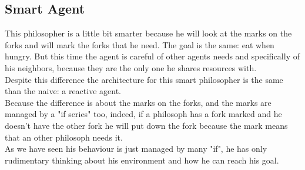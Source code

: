 \subsection{Smart Agent}
This philosopher is a little bit smarter because he will look at the marks on the forks and will mark the forks that he need. The goal is the same: eat when hungry. But this time the agent is careful of other agents needs and specifically of his neighbors, because they are the only one he shares resources with.\\
Despite this difference the architecture for this smart philosopher is the same than the naive: a reactive agent.\\
Because the difference is about the marks on the forks, and the marks are managed by a "if series" too, indeed, if a philosoph has a fork marked and he doesn't have the other fork he will put down the fork because the mark means that an other philosoph needs it.\\
As we have seen his behaviour is just managed by many "if", he has only rudimentary thinking about his environment and how he can reach his goal.
